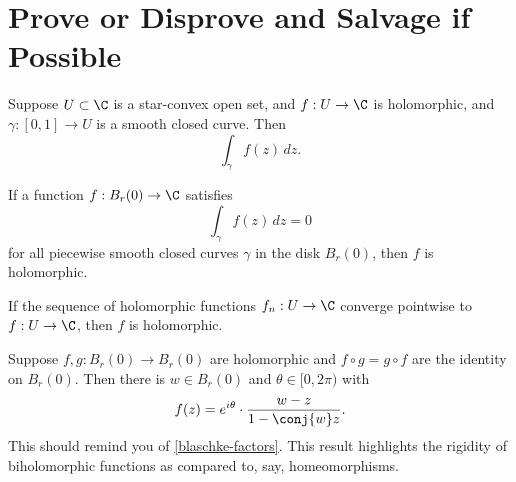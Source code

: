 \documentclass{homework}
\begin{document}
\section{Prove or Disprove and Salvage if Possible}

\begin{problem}\label{cauchy-for-starlike}Suppose $U \subset \C$ is a
  star-convex open set, and $f : U \to \C$ is holomorphic, and
  $\gamma : [0,1] \to U$ is a smooth closed curve.  Then
  \[
    \int_\gamma f(z) \, dz.
  \]
\end{problem}

\begin{problem}\label{moreras-theorem}If a function $f : B_r(0) \to \C$
  satisfies %
  \[
    \int_\gamma f(z) \, dz = 0
  \]
  for all piecewise smooth closed curves $\gamma$ in the disk
  $B_r(0)$, then $f$ is holomorphic.
\end{problem}

\begin{problem}\label{uniform-convergence-holomorphic}If the sequence of
  holomorphic functions $f_n : U \to \C$ converge pointwise to
  $f : U \to \C$, then $f$ is holomorphic.
\end{problem}

\begin{problem}\label{automorphisms-of-disk}Suppose $f, g : B_r(0) \to B_r(0)$ are holomorphic and
  $f \circ g = g \circ f$ are the identity on $B_r(0)$.  Then there is
  $w \in B_r(0)$ and $\theta \in [0,2\pi)$ with
  \[
    f(z) = e^{i\theta} \cdot \frac{w - z}{1 - \conj{w}z}.
  \]
  This should remind you of \ref{blaschke-factors}.  This result
  highlights the rigidity of biholomorphic functions as compared to,
  say, homeomorphisms.
\end{problem}
\end{document}
